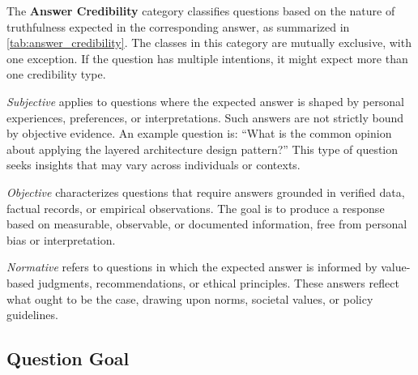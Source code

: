 The \textbf{Answer Credibility} category classifies questions based on the nature of truthfulness expected in the corresponding answer, as summarized in \autoref{tab:answer_credibility}. The classes in this category are mutually exclusive, with one exception. If the question has multiple intentions, it might expect more than one credibility type.


\emph{Subjective} applies to questions where the expected answer is shaped by personal experiences, preferences, or interpretations. Such answers are not strictly bound by objective evidence. An example question is: \enquote{What is the common opinion about applying the layered architecture design pattern?} This type of question seeks insights that may vary across individuals or contexts.

\emph{Objective} characterizes questions that require answers grounded in verified data, factual records, or empirical observations. The goal is to produce a response based on measurable, observable, or documented information, free from personal bias or interpretation.

\emph{Normative} refers to questions in which the expected answer is informed by value-based judgments, recommendations, or ethical principles. These answers reflect what ought to be the case, drawing upon norms, societal values, or policy guidelines.

\subsection{Question Goal}

